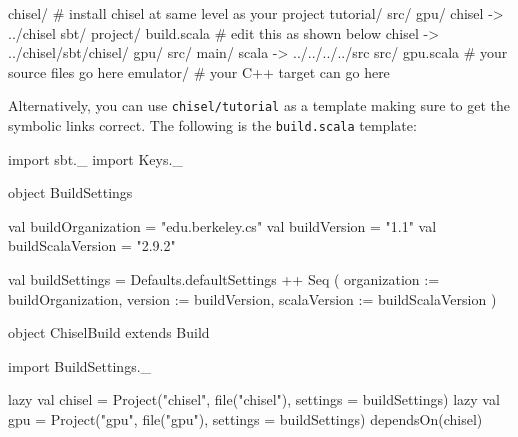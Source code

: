 \documentclass[twocolumn, 10pt]{article}
\begin{document}
\begin{bash}
chisel/           # install chisel at same level as your project
  tutorial/
  src/
gpu/
  chisel -> ../chisel
  sbt/
    project/
      build.scala # edit this as shown below
    chisel -> ../chisel/sbt/chisel/
    gpu/
      src/
        main/
          scala -> ../../../../src
  src/ 
    gpu.scala # your source files go here
  emulator/   # your C++ target can go here
\end{bash}

Alternatively, you can use \verb+chisel/tutorial+ as a template making
sure to get the symbolic links correct.
The following is the \verb+build.scala+ template:

\begin{scala}
import sbt._
import Keys._

object BuildSettings {
  val buildOrganization = "edu.berkeley.cs"
  val buildVersion = "1.1"
  val buildScalaVersion = "2.9.2"

  val buildSettings = Defaults.defaultSettings ++ Seq (
    organization := buildOrganization,
    version      := buildVersion,
    scalaVersion := buildScalaVersion
  )
}

object ChiselBuild extends Build {
  import BuildSettings._

  lazy val chisel = 
    Project("chisel", file("chisel"), 
            settings = buildSettings)
  lazy val gpu =
    Project("gpu", file("gpu"), 
            settings = buildSettings) 
      dependsOn(chisel)
}
\end{scala}
\end{document}
